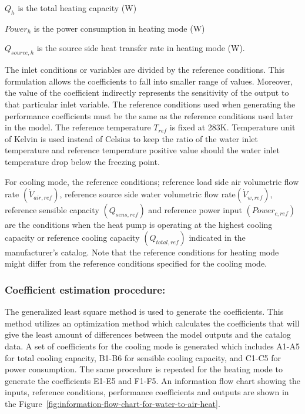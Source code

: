 \({Q_h}\) is the total heating capacity (W)

\(Powe{r_h}\) is the power consumption in heating mode (W)

\({Q_{source,h}}\) is the source side heat transfer rate in heating mode (W).

The inlet conditions or variables are divided by the reference conditions. This formulation allows the coefficients to fall into smaller range of values. Moreover, the value of the coefficient indirectly represents the sensitivity of the output to that particular inlet variable. The reference conditions used when generating the performance coefficients must be the same as the reference conditions used later in the model. The reference temperature \({T_{ref}}\) is fixed at 283K. Temperature unit of Kelvin is used instead of Celsius to keep the ratio of the water inlet temperature and reference temperature positive value should the water inlet temperature drop below the freezing point.

For cooling mode, the reference conditions; reference load side air volumetric flow rate \(\left( {{{\dot V}_{air,ref}}} \right)\), reference source side water volumetric flow rate\(\left( {{{\dot V}_{w,ref}}} \right)\), reference sensible capacity \(\left( {{Q_{sens,ref}}} \right)\) and reference power input \(\left( {Powe{r_{c,ref}}} \right)\) are the conditions when the heat pump is operating at the highest cooling capacity or reference cooling capacity \(\left( {{Q_{total,ref}}} \right)\) indicated in the manufacturer's catalog. Note that the reference conditions for heating mode might differ from the reference conditions specified for the cooling mode.

\subsubsection{Coefficient estimation procedure:}\label{coefficient-estimation-procedure}

The generalized least square method is used to generate the coefficients. This method utilizes an optimization method which calculates the coefficients that will give the least amount of differences between the model outputs and the catalog data. A set of coefficients for the cooling mode is generated which includes A1-A5 for total cooling capacity, B1-B6 for sensible cooling capacity, and C1-C5 for power consumption. The same procedure is repeated for the heating mode to generate the coefficients E1-E5 and F1-F5. An information flow chart showing the inputs, reference conditions, performance coefficients and outputs are shown in the Figure~\ref{fig:information-flow-chart-for-water-to-air-heat}.


